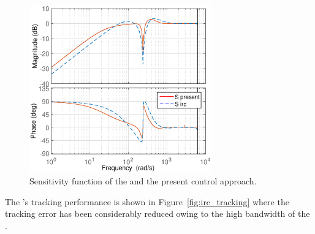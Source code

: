 \begin{figure}[h!]
  \centering
  \includegraphics[width=0.7\textwidth]{fig/matlab/sensitivity_irc.eps}
  \caption{\label{fig:sensitivity_irc}Sensitivity function of the \abbrIRC and the present control approach.}
\end{figure}

The \abbrIRC's tracking performance is shown in Figure~\ref{fig:irc_tracking} where the tracking error has been considerably reduced owing to the high bandwidth of the \abbrIRC.

